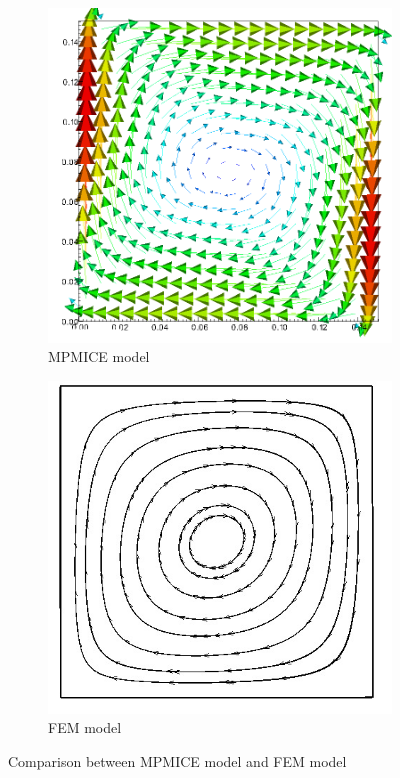 \documentclass[preprint,12pt]{elsarticle}
\begin{document}
\begin{figure}
\center
\begin{subfigure}[c]{0.5\linewidth}
\includegraphics[width=\linewidth]{thermal.png}
\caption{MPMICE model}
\end {subfigure}\hfill    
\begin{subfigure}[d]{0.5\linewidth}
\includegraphics[width=\linewidth]{velocity_thermal-1.jpg}
\caption{FEM model \cite{Ali}}
\end {subfigure}
\caption{Comparison between MPMICE model and FEM model}
\label{fig:thermal}
\end {figure}
\end{document}
